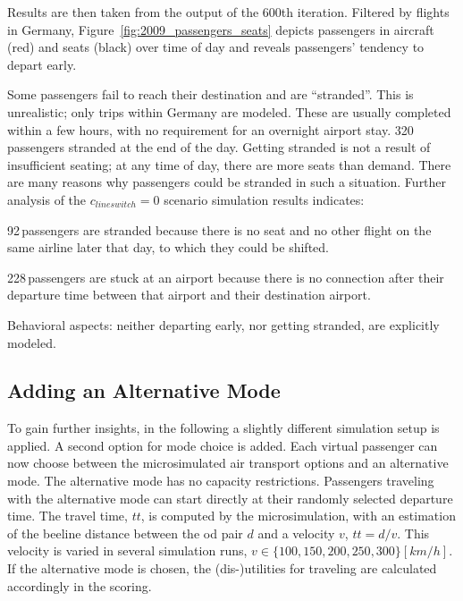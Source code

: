 
Results are then taken from the output of the 600th iteration. 
Filtered by flights in Germany, Figure~\ref{fig:2009_passengers_seats} depicts passengers in aircraft (red) and seats (black) over time of day
and reveals passengers' tendency to depart early. 

Some passengers fail to reach their destination and are ``stranded''.   
This is unrealistic; only trips within Germany are modeled. These are usually completed within a few hours, with no requirement for an overnight airport stay. 
320\,passengers stranded at the end of the day. 
Getting stranded is not a result of insufficient seating; at any time of day, there are more seats than demand.  
%
There are many reasons why passengers could be stranded in such a situation.
%
Further analysis of the $c_{lineswitch} = 0$ scenario simulation results indicates:
\begin{compactitem}
\item 92\,passengers are stranded because there is no seat and no other flight on the same airline later that day, to which they could be shifted.
\item 228\,passengers are stuck at an airport because there is no connection after their departure time 
	between that airport and their destination airport. 
\end{compactitem}

Behavioral aspects: neither departing early, nor getting stranded, are explicitly modeled.  

\subsection{Adding an Alternative Mode}
To gain further insights, in the following a slightly different simulation setup is applied. 
A second option for mode choice is added. 
Each virtual passenger can now choose between the microsimulated air transport options and an alternative mode. 
The alternative mode has no capacity restrictions. 
Passengers traveling with the alternative mode can start directly at their randomly selected departure time. 
The travel time, $tt$, is computed by the \gls{microsimulation}, with an estimation of the beeline distance between the \gls{od} pair $d$ and a velocity $v$, \ie $tt = d / v$.  
This velocity is varied in several simulation runs, \ie $v \in \{100, 150, 200, 250, 300 \} [km/h]$. 
If the alternative mode is chosen, the (dis-)utilities for traveling are calculated accordingly in the scoring.  

